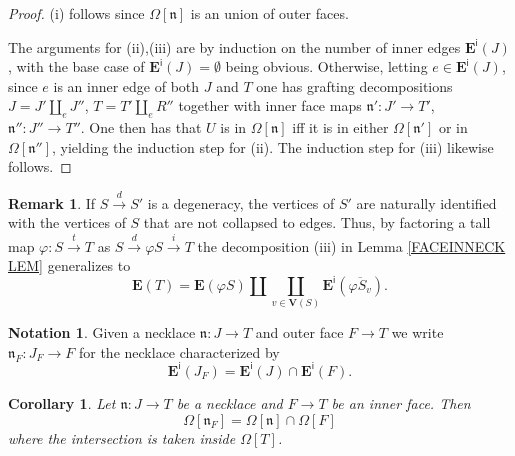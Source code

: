 \documentclass[a4paper,10pt
,draft
]{article}%
\numberwithin{equation}{section}
\numberwithin{figure}{section}
\newtheorem{corollary}[equation]{Corollary}%
\theoremstyle{definition} %
\newtheorem{remark}[equation]{Remark}%
\newtheorem{notation}[equation]{Notation}%
\newcommand{\1}{\ensuremath{\mathbbm 1}}%
\begin{document}
\begin{proof}
	(i) follows since $\Omega[\mathfrak{n}]$ is an union of outer faces.
	
	The arguments for (ii),(iii) are by induction on the number of inner edges $\boldsymbol{E}^{\mathsf{i}}(J)$,
	with the base case of $\boldsymbol{E}^{\mathsf{i}}(J) = \emptyset$  being obvious.
%	
	Otherwise, letting $e \in \boldsymbol{E}^{\mathsf{i}}(J)$, since $e$ is an inner edge of
	both $J$ and $T$
	one has grafting decompositions
	$J = J' \amalg_e J''$,
	$T = T' \amalg_e R''$
	together with inner face maps
	$\mathfrak{n}' \colon J' \to T'$,
	$\mathfrak{n}'' \colon J'' \to T''$.
%
	One then has that 
	$U$ is in $\Omega[\mathfrak{n}]$
	iff it is in either
	$\Omega[\mathfrak{n}']$ or in $\Omega[\mathfrak{n}'']$,
	yielding the induction step for (ii).
	The induction step for (iii) likewise follows. 
\end{proof}



\begin{remark}
	If $S \xrightarrow{d} S'$
	is a degeneracy,
	the vertices of $S'$ are naturally identified with
	the vertices of $S$ that are not collapsed to edges.
	Thus, by factoring a tall map
	$\varphi \colon S \xrightarrow{t} T$ as
	$S \xrightarrow{d} \varphi S \xrightarrow{i} T$
	the decomposition (iii) in Lemma \ref{FACEINNECK LEM}
	generalizes to 
\begin{equation}\label{EDGEBREAK EQ}
	\boldsymbol{E}(T) = 
	\boldsymbol{E}(\varphi S) \amalg 
	\coprod_{v \in \boldsymbol{V}(S)}
	\boldsymbol{E}^{\mathsf{i}}(\overline{\varphi S_v}).
\end{equation}
\end{remark}



\begin{notation}
	Given a necklace
	$\mathfrak{n} \colon J \to T$
	and outer face $F \to T$
	we write 
	$\mathfrak{n}_F \colon J_F \to F$
	for the necklace characterized by
\[
	\boldsymbol{E}^{\mathsf{i}}(J_F)
	=
	\boldsymbol{E}^{\mathsf{i}}(J)
	\cap
	\boldsymbol{E}^{\mathsf{i}}(F).
\]
\end{notation}



\begin{corollary}\label{NECINT COR}
	Let $\mathfrak{n} \colon J \to T$ be a necklace and
	$F \to T$ be an inner face.
	Then
\[
	\Omega[\mathfrak{n}_F] = \Omega[\mathfrak{n}] \cap \Omega[F]
\]
	where the intersection is taken inside
	$\Omega[T]$.
\end{corollary}
\end{document}
